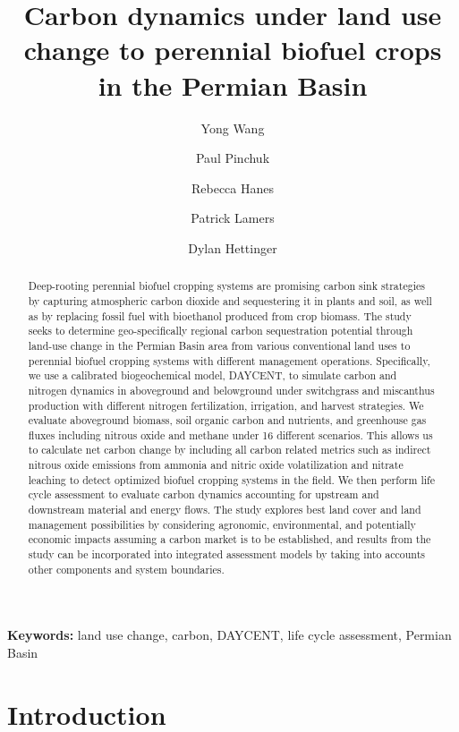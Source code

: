 \documentclass[11pt]{article}
\title{Carbon dynamics under land use change to perennial biofuel crops in the Permian Basin}
\author{Yong Wang \and Paul Pinchuk \and Rebecca Hanes \and Patrick Lamers \and Dylan Hettinger}
\date{}
\begin{document}
\maketitle

\begin{abstract}
Deep-rooting perennial biofuel cropping systems are promising carbon sink strategies by capturing atmospheric carbon dioxide and sequestering it in plants and soil, as well as by replacing fossil fuel with bioethanol produced from crop biomass. The study seeks to determine geo-specifically regional carbon sequestration potential through land-use change in the Permian Basin area from various conventional land uses to perennial biofuel cropping systems with different management operations. Specifically, we use a calibrated biogeochemical model, DAYCENT, to simulate carbon and nitrogen dynamics in aboveground and belowground under switchgrass and miscanthus production with different nitrogen fertilization, irrigation, and harvest strategies. We evaluate aboveground biomass, soil organic carbon and nutrients, and greenhouse gas fluxes including nitrous oxide and methane under 16 different scenarios. This allows us to calculate net carbon change by including all carbon related metrics such as indirect nitrous oxide emissions from ammonia and nitric oxide volatilization and nitrate leaching to detect optimized biofuel cropping systems in the field. We then perform life cycle assessment to evaluate carbon dynamics accounting for upstream and downstream material and energy flows. The study explores best land cover and land management possibilities by considering agronomic, environmental, and potentially economic impacts assuming a carbon market is to be established, and results from the study can be incorporated into integrated assessment models by taking into accounts other components and system boundaries.
\end{abstract}

\noindent\textbf{Keywords:} land use change, carbon, DAYCENT, life cycle assessment, Permian Basin







\section*{Introduction}
\end{document}
